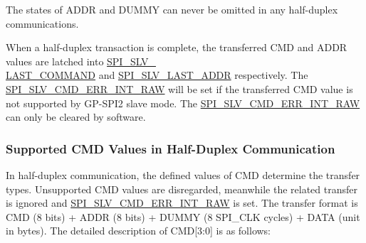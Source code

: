 \documentclass[main\_\_EN.tex]{subfiles}
\begin{document}
\begin{tiplisting}
The states of ADDR and DUMMY can never be omitted in any half-duplex communications.
\end{tiplisting}
\vspace{-1em}
When a half-duplex transaction is complete, the transferred CMD and ADDR values are latched into \hyperref[fielddesc:SPISLVLASTCOMMAND]{SPI\_SLV\_\\LAST\_COMMAND} and \hyperref[fielddesc:SPISLVLASTADDR]{SPI\_SLV\_LAST\_ADDR} respectively. The \hyperref[fielddesc:SPISLVCMDERRINTRAW]{SPI\_SLV\_CMD\_ERR\_INT\_RAW} will be set if the transferred CMD value is not supported by GP-SPI2 slave mode. The \hyperref[fielddesc:SPISLVCMDERRINTRAW]{SPI\_SLV\_CMD\_ERR\_INT\_RAW} can only be cleared by software.



\subsubsection{Supported CMD Values in Half-Duplex Communication} \label{sec:spi-cmd-values-half-duplex}

In half-duplex communication, the defined values of CMD determine the transfer types. Unsupported CMD values are disregarded, meanwhile the related transfer is ignored and \hyperref[fielddesc:SPISLVCMDERRINTRAW]{SPI\_SLV\_CMD\_ERR\_INT\_RAW} is set. The transfer format is CMD (8 bits) + ADDR (8 bits) + DUMMY (8 SPI\_CLK cycles) + DATA (unit in bytes). The detailed description of CMD[3:0] is as follows:
\end{document}
